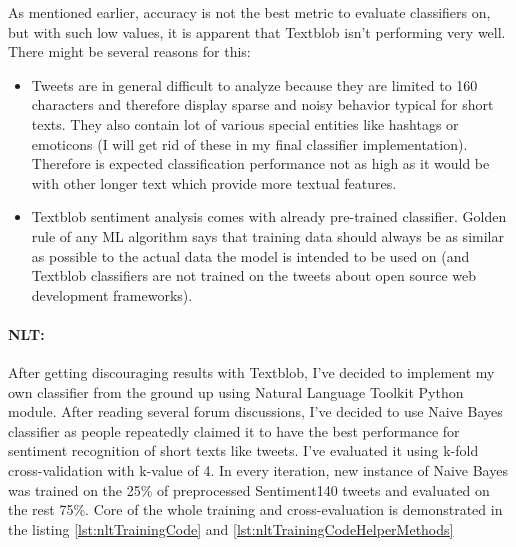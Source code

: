 As mentioned earlier, accuracy is not the best metric to evaluate classifiers on, but with such low values, it is apparent that Textblob isn't performing very well. There might be several reasons for this:
\begin{itemize}
\item Tweets are in general difficult to analyze because they are limited to 160 characters and therefore display sparse and noisy behavior typical for short texts. They also contain lot of various special entities like hashtags or emoticons (I will get rid of these in my final classifier implementation). Therefore is expected classification performance not as high as it would be with other longer text which provide more textual features.
\item Textblob sentiment analysis comes with already pre-trained classifier. Golden rule of any ML algorithm says that training data should always be as similar as possible to the actual data the model is intended to be used on (and Textblob classifiers are not trained on the tweets about open source web development frameworks).
\end{itemize}

\paragraph{NLT:} After getting discouraging results with Textblob, I've decided to implement my own classifier from the ground up using Natural Language Toolkit Python module. After reading several forum discussions, I've decided to use Naive Bayes classifier as people repeatedly claimed it to have the best performance for sentiment recognition of short texts like tweets. I've evaluated it using k-fold cross-validation with k-value of 4. In every iteration, new instance of Naive Bayes was trained on the 25\% of preprocessed Sentiment140 tweets and evaluated on the rest 75\%. Core of the whole training and cross-evaluation is demonstrated in the listing \ref{lst:nltTrainingCode} and \ref{lst:nltTrainingCodeHelperMethods}

